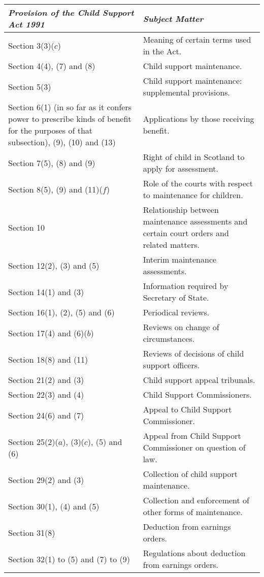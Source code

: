 \documentclass[a4paper,12pt]{article}
\begin{document}
\noindent
{\footnotesize
\begin{longtable}{p{237.78516pt}p{128.21193pt}}
\hline
\itshape Provision of the Child Support Act 1991 & \itshape Subject Matter\\
\hline
\endhead
\hline
\endlastfoot
Section 3(3)($c$)&Meaning of certain terms used in the Act.\\
Section 4(4), (7) and (8)&Child support maintenance.\\
Section 5(3)&Child support maintenance: supplemental provisions.\\
Section 6(1) (in so far as it confers power to prescribe kinds of benefit for the purposes of that subsection), (9), (10) and (13)&Applications by those receiving benefit.\\
Section 7(5), (8) and (9)&Right of child in Scotland to apply for assessment.\\
Section 8(5), (9) and (11)($f$)&Role of the courts with respect to maintenance for children.\\
Section 10&Relationship between maintenance assessments and certain court orders and related matters.\\
Section 12(2), (3) and (5)&Interim maintenance assessments.\\
Section 14(1) and (3)&{Information required by} Secretary of State.\\
Section 16(1), (2), (5) and (6)&Periodical reviews.\\
Section 17(4) and (6)($b$)&Reviews on change of circumstances.\\
Section 18(8) and (11)&{Reviews of decisions of} child support officers.\\
Section 21(2) and (3)&Child support appeal tribu\-nals.\\
Section 22(3) and (4)&Child Support Commissioners.\\
Section 24(6) and (7)&Appeal to Child Support Commissioner.\\
Section 25(2)($a$), (3)($c$), (5) and (6)&Appeal from Child Support Commissioner on question of law.\\
Section 29(2) and (3)&Collection of child support maintenance.\\
Section 30(1), (4) and (5)&Collection and enforcement of other forms of maintenance.\\
Section 31(8)&Deduction from earnings orders.\\
Section 32(1) to (5) and (7) to (9)&Regulations about deduction from earnings orders.\\

\end{longtable}}
\end{document}
